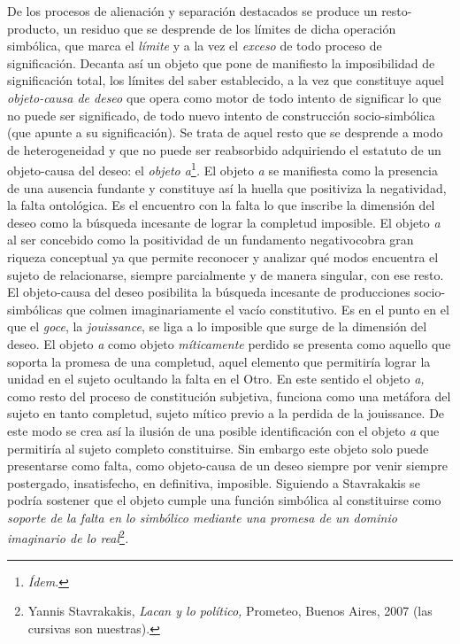 \documentclass{book}
\begin{document}
De los procesos de alienación y separación destacados se produce un
resto-producto, un residuo que se desprende de los límites de dicha
operación simbólica, que marca el \emph{límite} y a la vez el
\emph{exceso} de todo proceso de significación. Decanta así un objeto
que pone de manifiesto la imposibilidad de significación total, los
límites del saber establecido, a la vez que constituye aquel
\emph{objeto-causa de deseo} que opera como motor de todo intento de
significar lo que no puede ser significado, de todo nuevo intento de
construcción socio-simbólica (que apunte a su significación). Se trata
de aquel resto que se desprende a modo de heterogeneidad y que no puede
ser reabsorbido adquiriendo el estatuto de un objeto-causa del deseo: el
\emph{objeto a}\footnote{\emph{Ídem}.}\emph{.} El objeto \emph{a} se
manifiesta como la presencia de una ausencia fundante y constituye así
la huella que positiviza la negatividad, la falta ontológica. Es el
encuentro con la falta lo que inscribe la dimensión del deseo como la
búsqueda incesante de lograr la completud imposible. El objeto \emph{a}
al ser concebido como la positividad de un fundamento negativocobra gran
riqueza conceptual ya que permite reconocer y analizar qué modos
encuentra el sujeto de relacionarse, siempre parcialmente y de manera
singular, con ese resto. El objeto-causa del deseo posibilita la
búsqueda incesante de producciones socio-simbólicas que colmen
imaginariamente el vacío constitutivo. Es en el punto en el que el
\emph{goce}, la \emph{jouissance}, se liga a lo imposible que surge de
la dimensión del deseo. El objeto \emph{a} como objeto
\emph{míticamente} perdido se presenta como aquello que soporta la
promesa de una completud, aquel elemento que permitiría lograr la unidad
en el sujeto ocultando la falta en el Otro. En este sentido el objeto
\emph{a,} como resto del proceso de constitución subjetiva, funciona
como una metáfora del sujeto en tanto completud, sujeto mítico previo a
la perdida de la jouissance. De este modo se crea así la ilusión de una
posible identificación con el objeto \emph{a} que permitiría al sujeto
completo constituirse. Sin embargo este objeto solo puede presentarse
como falta, como objeto-causa de un deseo siempre por venir siempre
postergado, insatisfecho, en definitiva, imposible. Siguiendo a
Stavrakakis se podría sostener que el objeto cumple una función
simbólica al constituirse como \emph{soporte de la falta en lo simbólico
mediante una promesa de un dominio imaginario de lo
real}\footnote{Yannis Stavrakakis, \emph{Lacan y lo político,} Prometeo,
  Buenos Aires, 2007 (las cursivas son nuestras).}\emph{.}
\end{document}
